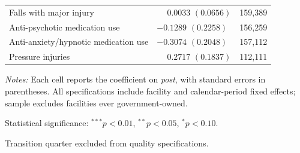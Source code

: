\documentclass[11pt]{article}
\begin{document}
\begin{table}[!ht]
\begin{threeparttable}
\begin{tabularx}{\textwidth}{@{} l Y r @{}}
Falls with major injury &  & 159,389 \\
Anti-psychotic medication use &  & 156,259 \\
Anti-anxiety/hypnotic medication use &  & 157,112 \\
Pressure injuries &  & 112,111 \\
\bottomrule
\end{tabularx}

\begin{tablenotes}[flushleft]
\footnotesize
\item \textit{Notes:} Each cell reports the coefficient on \textit{post}, with standard errors in parentheses. All specifications include facility and calendar-period fixed effects; sample excludes facilities ever government-owned.
\item Statistical significance: $^{***}p<0.01$, $^{**}p<0.05$, $^{*}p<0.10$.
\item Transition quarter excluded from quality specifications.
\end{tablenotes}
\end{threeparttable}
\end{table}
\end{document}
